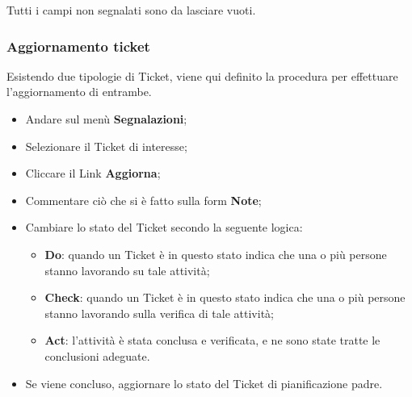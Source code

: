 Tutti i campi non segnalati sono da lasciare vuoti. 

\subsubsection{Aggiornamento ticket}

Esistendo due tipologie di Ticket, viene qui definito la procedura per effettuare l’aggiornamento di entrambe.


\begin{itemize}
\item Andare sul menù \textbf{Segnalazioni}; 
\item Selezionare il Ticket di interesse; 
\item Cliccare il Link \textbf{Aggiorna}; 
\item Commentare ciò che si è fatto sulla form \textbf{Note}; 
\item Cambiare lo stato del Ticket secondo la seguente logica:
		\begin{itemize}
		\item \textbf{Do}: quando un Ticket è in questo stato indica che una o più persone stanno 
		lavorando su tale attività; 
		\item \textbf{Check}: quando un Ticket è in questo stato indica che una o più persone 
		stanno lavorando sulla verifica di tale attività; 
		\item \textbf{Act}: l’attività è stata conclusa e verificata, e ne sono state tratte le conclusioni adeguate. 
		
		\end{itemize} 

\item Se viene concluso, aggiornare lo stato del Ticket di pianificazione padre. 

\end{itemize}



